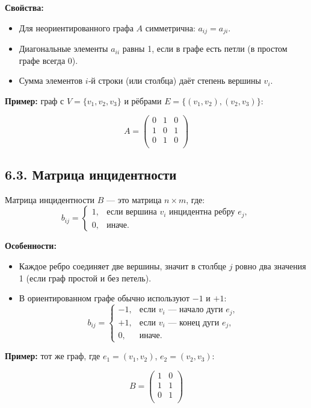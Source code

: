\documentclass{article}
\begin{document}
\textbf{Свойства:}
\begin{itemize}[leftmargin=*]
  \item Для неориентированного графа $A$ симметрична: $a_{ij} = a_{ji}$.
  \item Диагональные элементы $a_{ii}$ равны 1, если в графе есть петли (в простом графе всегда 0).
  \item Сумма элементов $i$‑й строки (или столбца) даёт степень вершины $v_i$.
\end{itemize}

\textbf{Пример:} граф с $V = \{v_1, v_2, v_3\}$ и рёбрами $E = \{(v_1,v_2), (v_2,v_3)\}$:

\[
A =
\begin{pmatrix}
  0 & 1 & 0 \\
  1 & 0 & 1 \\
  0 & 1 & 0 \\
\end{pmatrix}
\]

\subsection*{6.3. Матрица инцидентности}

Матрица инцидентности $B$ — это матрица $n \times m$, где:
\[
  b_{ij} = \begin{cases}
    1, & \text{если вершина } v_i \text{ инцидентна ребру } e_j, \\
    0, & \text{иначе}.
  \end{cases}
\]

\textbf{Особенности:}
\begin{itemize}[leftmargin=*]
  \item Каждое ребро соединяет две вершины, значит в столбце $j$ ровно два значения 1 (если граф простой и без петель).
  \item В ориентированном графе обычно используют $-1$ и $+1$:  
    \[
    b_{ij} = \begin{cases}
      -1, & \text{если } v_i \text{ — начало дуги } e_j, \\
      +1, & \text{если } v_i \text{ — конец дуги } e_j, \\
      0, & \text{иначе}.
    \end{cases}
    \]
\end{itemize}

\textbf{Пример:} тот же граф, где $e_1 = (v_1,v_2)$, $e_2 = (v_2,v_3)$:

\[
B =
\begin{pmatrix}
  1 & 0 \\
  1 & 1 \\
  0 & 1 \\
\end{pmatrix}
\]
\end{document}
